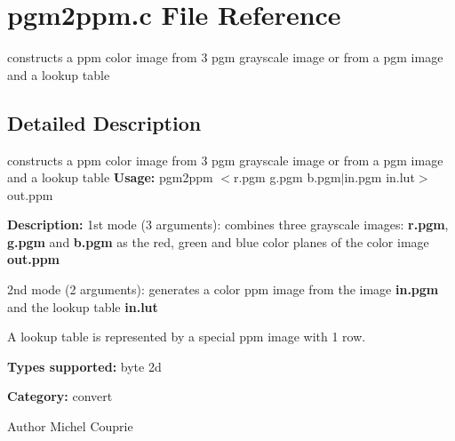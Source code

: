 \section{pgm2ppm.c File Reference}
\label{pgm2ppm_8c}


constructs a ppm color image from 3 pgm grayscale image or from a pgm image and a lookup table  




\subsection{Detailed Description}
constructs a ppm color image from 3 pgm grayscale image or from a pgm image and a lookup table {\bfseries Usage:} pgm2ppm $<$r.pgm g.pgm b.pgm$|$in.pgm in.lut$>$ out.ppm

{\bfseries Description:} 1st mode (3 arguments): combines three grayscale images: {\bfseries r.pgm}, {\bfseries g.pgm} and {\bfseries b.pgm} as the red, green and blue color planes of the color image {\bfseries out.ppm}

2nd mode (2 arguments): generates a color ppm image from the image {\bfseries in.pgm} and the lookup table {\bfseries in.lut}

A lookup table is represented by a special ppm image with 1 row.

{\bfseries Types supported:} byte 2d

{\bfseries Category:} convert

\begin{DoxyAuthor}{Author}
Michel Couprie 
\end{DoxyAuthor}
